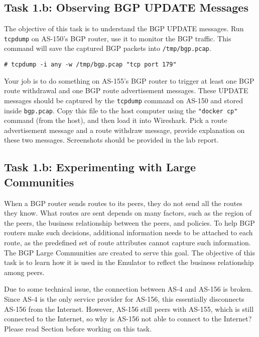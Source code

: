\subsection{Task 1.b: Observing BGP UPDATE Messages} 

The objective of this task is to understand the BGP UPDATE messages. 
Run \texttt{tcpdump} on AS-150's BGP router,
use it to monitor the BGP traffic. This command will save the 
captured BGP packets into \texttt{/tmp/bgp.pcap}.  

\begin{lstlisting}
# tcpdump -i any -w /tmp/bgp.pcap "tcp port 179"
\end{lstlisting}

Your job is to do something on AS-155's BGP router to trigger
at least one BGP route withdrawal and one BGP route advertisement
messages. These UPDATE messages should be captured by
the \texttt{tcpdump} command on AS-150 and stored inside \texttt{bgp.pcap}.
Copy this file to the host computer using the \texttt{"docker cp"} command (from the host),
and then load it into Wireshark. 
Pick a route advertisement message and a route withdraw message, provide
explanation on these two messages. Screenshots should be provided in the 
lab report.



\subsection{Task 1.b: Experimenting with Large Communities} 

When a BGP router sends routes to its peers, they do not send all the routes they
know. What routes are sent depends on many factors, such as the
region of the peers, the business relationship between the peers,
and policies. To help BGP routers make such decisions, additional
information needs to be attached to each route, as the predefined
set of route attributes cannot capture such information.
The BGP Large Communities are created to serve this goal.
The objective of this task is to learn how it is used 
in the Emulator to reflect the business relationship
among peers. 


Due to some technical issue, the connection between AS-4 and AS-156 is broken. 
Since AS-4 is the only service provider for AS-156, this essentially
disconnects AS-156 from the Internet. However, AS-156 still peers with AS-155, 
which is still connected to the Internet, so why is AS-156 not able to 
connect to the Internet?  
Please read Section \bigcommunity before working on this task. 

